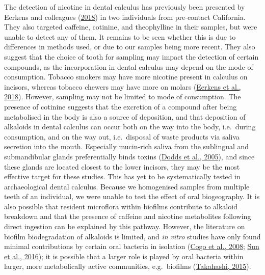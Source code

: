 \documentclass[
  letterpaper,
]{book}
\begin{document}
The detection of nicotine in dental calculus has previously been
presented by Eerkens and colleagues
(\protect\hyperlink{ref-eerkensDentalCalculus2018}{2018}) in two
individuals from pre-contact California. They also targeted caffeine,
cotinine, and theophylline in their samples, but were unable to detect
any of them. It remains to be seen whether this is due to differences in
methods used, or due to our samples being more recent. They also suggest
that the choice of tooth for sampling may impact the detection of
certain compounds, as the incorporation in dental calculus may depend on
the mode of consumption. Tobacco smokers may have more nicotine present
in calculus on incisors, whereas tobacco chewers may have more on molars
(\protect\hyperlink{ref-eerkensDentalCalculus2018}{Eerkens et al.,
2018}). However, sampling may not be limited to mode of consumption. The
presence of cotinine suggests that the excretion of a compound after
being metabolised in the body is also a source of deposition, and that
deposition of alkaloids in dental calculus can occur both on the way
into the body, i.e.~during consumption, and on the way out,
i.e.~disposal of waste products via saliva secretion into the mouth.
Especially mucin-rich saliva from the sublingual and submandibular
glands preferentially binds toxins
(\protect\hyperlink{ref-doddsHealthBenefits2005}{Dodds et al., 2005}),
and since these glands are located closest to the lower incisors, they
may be the most effective target for these studies. This has yet to be
systematically tested in archaeological dental calculus. Because we
homogenised samples from multiple teeth of an individual, we were unable
to test the effect of oral biogeography. It is also possible that
resident microflora within biofilms contribute to alkaloid breakdown and
that the presence of caffeine and nicotine metabolites following direct
ingestion can be explained by this pathway. However, the literature on
biofilm biodegradation of alkaloids is limited, and \emph{in vitro}
studies have only found minimal contributions by certain oral bacteria
in isolation (\protect\hyperlink{ref-cogoVitroEvaluation2008}{Cogo et
al., 2008}; \protect\hyperlink{ref-sunMetabolomicsEvaluation2016}{Sun et
al., 2016}); it is possible that a larger role is played by oral
bacteria within larger, more metabolically active communities,
e.g.~biofilms
(\protect\hyperlink{ref-takahashiOralMicrobiome2015}{Takahashi, 2015}).
\end{document}
